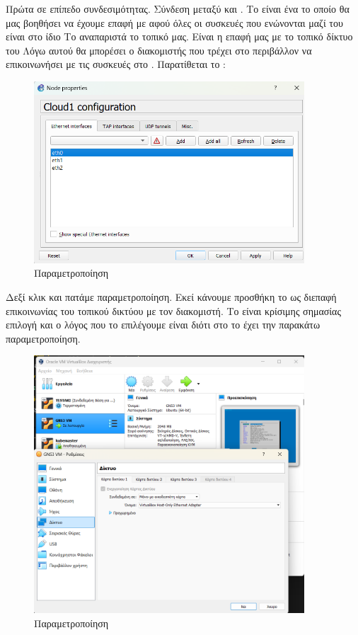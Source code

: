 Πρώτα σε επίπεδο συνδεσιμότητας. Σύνδεση μεταξύ  και .
Το  είναι ένα  το οποίο θα μας βοηθήσει να έχουμε επαφή με 
αφού όλες οι συσκευές που ενώνονται μαζί του είναι στο ίδιο 
Το  αναπαριστά το τοπικό  μας. Είναι η επαφή μας με το τοπικό δίκτυο του
 Λόγω αυτού θα μπορέσει ο διακομιστής που τρέχει στο  περιβάλλον
να επικοινωνήσει με τις συσκευές στο . Παρατίθεται το :

\FloatBarrier

\begin{figure}[htb]
	\centering
	\includegraphics[width=0.9\textwidth]{graphics/cloud_configuration.png}
	\caption{Παραμετροποίηση }
\end{figure}

\FloatBarrier

Δεξί κλικ και πατάμε παραμετροποίηση. Εκεί κάνουμε προσθήκη το  ως διεπαφή
επικοινωνίας του τοπικού δικτύου με τον διακομιστή. Το  είναι κρίσιμης σημασίας επιλογή
και ο λόγος που το επιλέγουμε είναι διότι στο  το  έχει την παρακάτω παραμετροποίηση.

\begin{figure}[htb]
	\centering
	\includegraphics[width=0.9\textwidth]{graphics/eth0.png}
	\caption{Παραμετροποίηση }
\end{figure}


